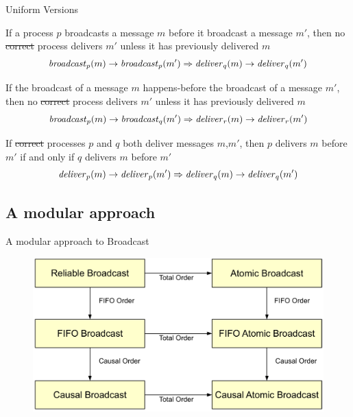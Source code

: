 \begin{frame}{Uniform Versions}

{\footnotesize
\begin{definition}
If a process $p$ broadcasts a message $m$ before it broadcast a message $m'$, then 
no \sout{correct} process delivers $m'$ unless it has previously delivered $m$
\[
  \mathit{broadcast}_p(m) \rightarrow \mathit{broadcast}_p(m') \Rightarrow \mathit{deliver}_q(m) \rightarrow \mathit{deliver}_q(m')
\]
\end{definition}

\begin{definition}
If the broadcast of a message $m$ \alert{happens-before} the broadcast of a message $m'$, then 
no \sout{correct} process delivers $m'$ unless it has previously delivered $m$
\[
  \mathit{broadcast}_p(m) \rightarrow \mathit{broadcast}_q(m') \Rightarrow \mathit{deliver}_r(m) \rightarrow \mathit{deliver}_r(m')
\]
\end{definition}

\begin{definition}
If \sout{correct} processes $p$ and $q$ both deliver messages $m$,$m'$, then $p$ delivers $m$ before $m'$ if and only if $q$ delivers $m$ before $m'$
\[
  \mathit{deliver}_p(m) \rightarrow \mathit{deliver}_p(m') \Rightarrow \mathit{deliver}_q(m) \rightarrow \mathit{deliver}_q(m')
\]
\end{definition}
}
\end{frame}

\subsection{A modular approach}

\begin{frame}{A modular approach to Broadcast}

\begin{figure}
	\includegraphics[width=\textwidth]{rb-modular-rb1}
\end{figure}

\end{frame}

